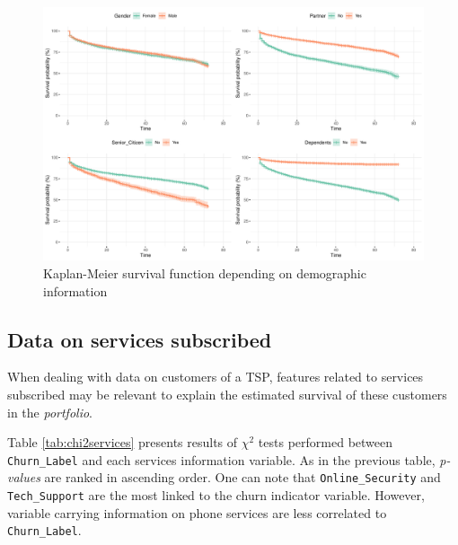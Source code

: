 \documentclass[
]{book}
\begin{document}
\begin{figure}

{\centering \includegraphics[width=50in]{./imgs/demographics_plot} 

}

\caption{Kaplan-Meier survival function depending on demographic information}\label{fig:kmdemographics}
\end{figure}

\hypertarget{data-on-services-subscribed}{%
\subsection*{Data on services subscribed}\label{data-on-services-subscribed}}

When dealing with data on customers of a TSP, features related to services subscribed may be relevant to explain the estimated survival of these customers in the \emph{portfolio}.

Table \ref{tab:chi2services} presents results of \(\chi^2\) tests performed between \texttt{Churn\_Label} and each services information variable. As in the previous table, \emph{p-values} are ranked in ascending order. One can note that \texttt{Online\_Security} and \texttt{Tech\_Support} are the most linked to the churn indicator variable. However, variable carrying information on phone services are less correlated to \texttt{Churn\_Label}.
\end{document}

